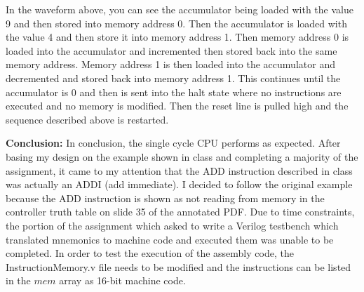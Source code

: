 \documentclass{article}         %
\begin{document}
In the waveform above, you can see the accumulator being loaded with the value 9 and then stored into memory address 0. Then the accumulator is loaded with the value 4 and then store it into memory address 1. Then memory address 0 is loaded into the accumulator and incremented then stored back into the same memory address. Memory address 1 is then loaded into the accumulator and decremented and stored back into memory address 1. This continues until the accumulator is 0 and then is sent into the halt state where no instructions are executed and no memory is modified. Then the reset line is pulled high and the sequence described above is restarted.\\

\newpage

\textbf{Conclusion:} In conclusion, the single cycle CPU performs as expected. After basing my design on the example shown in class and completing a majority of the assignment, it came to my attention that the ADD instruction described in class was actually an ADDI (add immediate). I decided to follow the original example because the ADD instruction is shown as not reading from memory in the controller truth table on slide 35 of the annotated PDF. Due to time constraints, the portion of the assignment which asked to write a Verilog testbench which translated mnemonics to machine code and executed them was unable to be completed. In order to test the execution of the assembly code, the InstructionMemory.v file needs to be modified and the instructions can be listed in the $mem$ array as 16-bit machine code.
\end{document}
